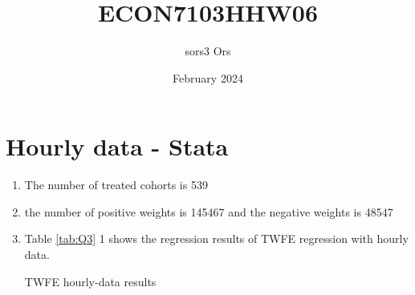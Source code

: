 \documentclass{article}
\title{ECON7103HHW06}
\author{sors3 Ors}
\date{February 2024}
\begin{document}
\maketitle

\section{Hourly data - Stata}

\begin{enumerate}
\item 
The number of treated cohorts is 539



\item 
the number of positive weights is 145467 and the negative weights is 48547


\item
Table \ref{tab:Q3} 1 shows the regression results of TWFE regression with hourly data. 

\begin{table}[ht]
    \centering
    
    \caption{TWFE hourly-data results}
    \label{tab:Q3}
\end{table}

\end{enumerate}
\end{document}
